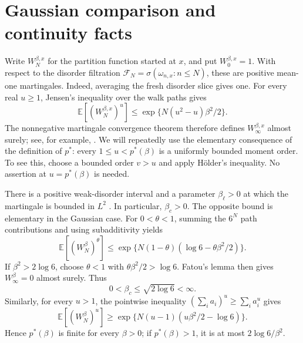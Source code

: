 \documentclass[11pt]{amsart}
\newcommand{\E}{\mathbb E}
\newcommand{\ps}{p^*}
\theoremstyle{remark}
\numberwithin{equation}{section}
\begin{document}
\section{Gaussian comparison and continuity facts}\label{sec:comparison}

Write $W_N^{\beta,x}$ for the partition function started at $x$, and put
$W_0^{\beta,x}=1$. With respect to the disorder filtration
$\mathcal F_N=\sigma(\omega_{n,x}:n\le N)$, these are positive mean-one
martingales. Indeed, averaging the fresh disorder slice gives one. For every
real $u\ge1$, Jensen's inequality over the walk paths gives
\begin{equation}\label{eq:finite-moments}
 \E[(W_N^{\beta,x})^u]\le \exp\{N(u^2-u)\beta^2/2\}.
\end{equation}
The nonnegative martingale convergence theorem therefore defines
$W_\infty^{\beta,x}$ almost surely; see, for example,
\cite[Theorem~4.2.12]{Durrett}. We will repeatedly use the elementary consequence
of the definition of $\ps$: every $1\le u<\ps(\beta)$ is a uniformly bounded
moment order. To see this, choose a bounded order $v>u$ and apply H\"older's
inequality. No assertion at $u=\ps(\beta)$ is needed.

There is a positive weak-disorder interval and a parameter $\beta_\ell>0$ at
which the martingale is bounded in $L^2$ \cite[Theorem~A]{Junk}. In particular,
$\beta_c>0$. The opposite bound is elementary in the Gaussian case. For
$0<\theta<1$, summing the $6^N$ path contributions and using subadditivity yields
\[
 \E[(W_N^\beta)^\theta]
 \le \exp\{N(1-\theta)(\log6-\theta\beta^2/2)\}.
\]
If $\beta^2>2\log6$, choose $\theta<1$ with $\theta\beta^2/2>\log6$.
Fatou's lemma then gives $W_\infty^\beta=0$ almost surely. Thus
\begin{equation}\label{eq:critical-finite}
 0<\beta_c\le\sqrt{2\log6}<\infty.
\end{equation}
Similarly, for every $u>1$, the pointwise inequality
$(\sum_i a_i)^u\ge\sum_i a_i^u$ gives
\begin{equation}\label{eq:diagonal}
 \E[(W_N^\beta)^u]
 \ge \exp\{N(u-1)(u\beta^2/2-\log6)\}.
\end{equation}
Hence $\ps(\beta)$ is finite for every $\beta>0$; if $\ps(\beta)>1$, it is at
most $2\log6/\beta^2$.
\end{document}

